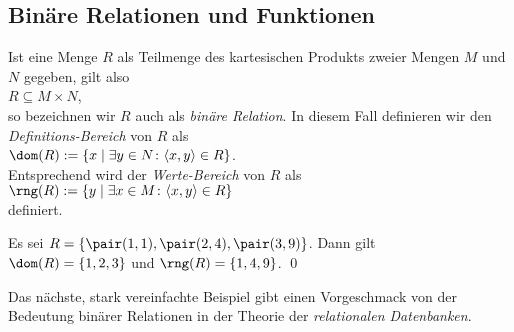 \subsection{Binäre Relationen und Funktionen}
Ist eine Menge $R$ als Teilmenge des kartesischen Produkts zweier Mengen $M$ und $N$ gegeben, gilt
also \\[0.2cm]
\hspace*{1.3cm} $R \subseteq M \times N$, \\[0.2cm]
so bezeichnen wir $R$ auch als \emph{binäre Relation}.  In diesem Fall definieren wir den
\emph{Definitions-Bereich} von $R$ als \\[0.2cm]
\hspace*{1.3cm} $\dom(R) := \{ x \mid \exists y \in N \colon \langle x, y \rangle \in R \}$.  
\\[0.2cm]
Entsprechend wird der \emph{Werte-Bereich} von $R$ als \\[0.2cm]
\hspace*{1.3cm} $\rng(R) := \{ y \mid \exists x \in M \colon \langle x, y \rangle \in R\}$ \\[0.2cm]
definiert.  

\example
 Es sei $R = \{ \pair(1,1), \pair(2,4), \pair(3,9) \}$.  Dann gilt \\[0.2cm]
\hspace*{1.3cm} $\dom(R) = \{1,2,3\}$ \quad und \quad $\rng(R) = \{1,4,9\}$. \qed
\next

\noindent
Das nächste, stark vereinfachte Beispiel gibt einen Vorgeschmack von der Bedeutung binärer
Relationen in der Theorie der \emph{relationalen Datenbanken}.

